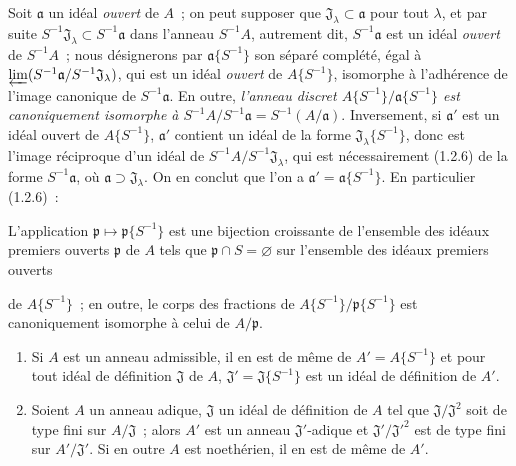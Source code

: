 \begin{env}[7.6.9]
\label{0.7.6.9-fr}
Soit $\mathfrak a$ un idéal \emph{ouvert} de $A$~; on peut supposer que
$\mathfrak J_\lambda\subset\mathfrak a$ pour tout $\lambda$, et par suite
$S^{-1}\mathfrak J_\lambda\subset S^{-1}\mathfrak a$ dans l'anneau
$S^{-1}A$, autrement dit, $S^{-1}\mathfrak a$ est un idéal \emph{ouvert} de
$S^{-1}A$~; nous désignerons par $\mathfrak a\{S^{-1}\}$ son séparé complété,
égal à $\varprojlim(S^{-1}\mathfrak a/S^{-1}\mathfrak J_\lambda)$, qui est un
idéal \emph{ouvert} de $A\{S^{-1}\}$, isomorphe à l'adhérence de l'image
canonique de $S^{-1}\mathfrak a$. En outre, \emph{l'anneau discret
$A\{S^{-1}\}/\mathfrak a\{S^{-1}\}$ est canoniquement isomorphe à
$S^{-1}A/S^{-1}\mathfrak a=S^{-1}(A/\mathfrak a)$}. Inversement, si
$\mathfrak a'$ est un idéal ouvert de $A\{S^{-1}\}$, $\mathfrak a'$ contient
un idéal de la forme $\mathfrak J_\lambda\{S^{-1}\}$, donc est l'image
réciproque d'un idéal de $S^{-1}A/S^{-1}\mathfrak J_\lambda$, qui est
nécessairement (1.2.6) de la forme $S^{-1}\mathfrak a$, où
$\mathfrak a\supset\mathfrak J_\lambda$. On en conclut que l'on a
$\mathfrak a'=\mathfrak a\{S^{-1}\}$. En particulier (1.2.6)~:
\end{env}

\begin{proposition}[7.6.10]
\label{0.7.6.10-fr}
L'application $\mathfrak p\mapsto\mathfrak p\{S^{-1}\}$ est une bijection
croissante de l'ensemble des idéaux premiers ouverts $\mathfrak p$ de $A$ tels
que $\mathfrak p\cap S=\varnothing$ sur l'ensemble des idéaux premiers ouverts


de $A\{S^{-1}\}$~; en outre, le corps des fractions de
$A\{S^{-1}\}/\mathfrak p\{S^{-1}\}$ est canoniquement isomorphe à celui de
$A/\mathfrak p$.
\end{proposition}

\begin{proposition}[7.6.11]
\label{0.7.6.11-fr}
\begin{enumerate}
  \item[\rm(i)] Si $A$ est un anneau admissible, il en est de même de
    $A'=A\{S^{-1}\}$ et pour tout idéal de définition $\mathfrak J$ de $A$,
    $\mathfrak J'=\mathfrak J\{S^{-1}\}$ est un idéal de définition de $A'$.
  \item[\rm(ii)] Soient $A$ un anneau adique, $\mathfrak J$ un idéal de
    définition de $A$ tel que $\mathfrak J/\mathfrak J^2$ soit de type fini
    sur $A/\mathfrak J$~; alors $A'$ est un anneau $\mathfrak J'$-adique et
    $\mathfrak J'/\mathfrak J'^2$ est de type fini sur
    $A'/\mathfrak J'$. Si en outre $A$ est noethérien, il en est de même de
    $A'$.
\end{enumerate}
\end{proposition}

